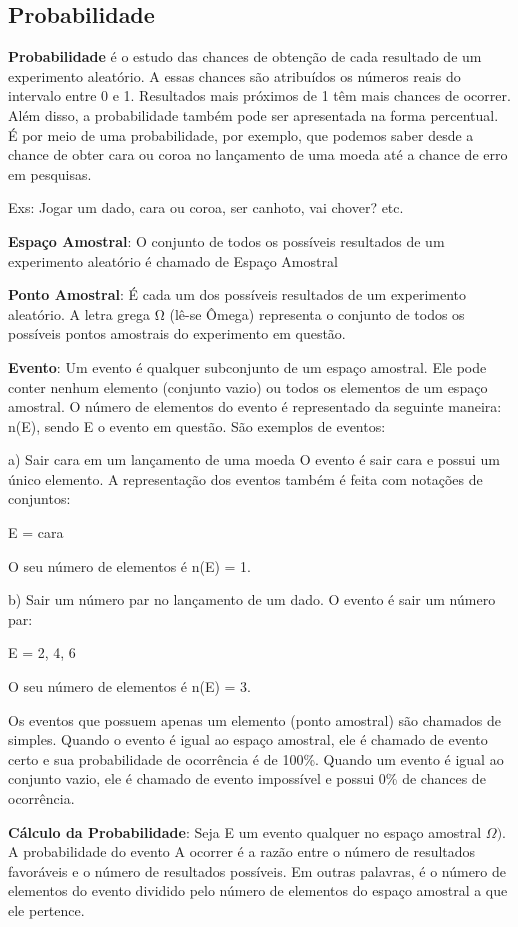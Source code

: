 \begin{multicols*}{2}
	\section{Probabilidade}

	\textbf{Probabilidade} é o estudo das chances de obtenção de cada resultado de um experimento aleatório. A essas chances são atribuídos os números reais do intervalo entre 0 e 1. Resultados mais próximos de 1 têm mais chances de ocorrer. Além disso, a probabilidade também pode ser apresentada na forma percentual. É por meio de uma probabilidade, por exemplo, que podemos saber desde a chance de obter cara ou coroa no lançamento de uma moeda até a chance de erro em pesquisas.

	Exs: Jogar um dado, cara ou coroa, ser canhoto, vai chover? etc.

	\textbf{Espaço Amostral}: O conjunto de todos os possíveis resultados de um experimento aleatório é chamado de Espaço Amostral

	\textbf{Ponto Amostral}: É cada um dos possíveis resultados de um experimento aleatório.
	A letra grega Ω (lê-se Ômega) representa o conjunto de todos os possíveis pontos amostrais do experimento em questão.

	\textbf{Evento}: Um evento é qualquer subconjunto de um espaço amostral. Ele pode conter nenhum elemento (conjunto vazio) ou todos os elementos de um espaço amostral. O número de elementos do evento é representado da seguinte maneira: n(E), sendo E o evento em questão. São exemplos de eventos:

	a) Sair cara em um lançamento de uma moeda O evento é sair cara e possui um único elemento. A representação dos eventos também é feita com notações de conjuntos:

	E = {cara}

	O seu número de elementos é n(E) = 1.

	b) Sair um número par no lançamento de um dado. O evento é sair um número par:

	E = {2, 4, 6}

	O seu número de elementos é n(E) = 3.

	Os eventos que possuem apenas um elemento (ponto amostral) são chamados de simples. Quando o evento é igual ao espaço amostral, ele é chamado de evento certo e sua probabilidade de ocorrência é de 100\%. Quando um evento é igual ao conjunto vazio, ele é chamado de evento impossível e possui 0\% de chances de ocorrência.

	\textbf{Cálculo da Probabilidade}: Seja E um evento qualquer no espaço amostral $\Omega)$. A probabilidade do evento A ocorrer é a razão entre o número de resultados favoráveis e o número de resultados possíveis. Em outras palavras, é o número de elementos do evento dividido pelo número de elementos do espaço amostral a que ele pertence.


\end{multicols*}
